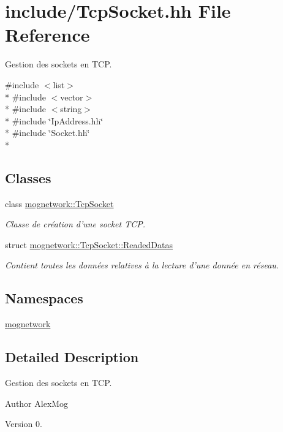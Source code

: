 \hypertarget{_tcp_socket_8hh}{\section{include/\-Tcp\-Socket.hh File Reference}
\label{_tcp_socket_8hh}
}


Gestion des sockets en T\-C\-P.  


{\ttfamily \#include $<$list$>$}\\*
{\ttfamily \#include $<$vector$>$}\\*
{\ttfamily \#include $<$string$>$}\\*
{\ttfamily \#include \char`\"{}Ip\-Address.\-hh\char`\"{}}\\*
{\ttfamily \#include \char`\"{}Socket.\-hh\char`\"{}}\\*
\subsection*{Classes}
\begin{DoxyCompactItemize}
\item 
class \hyperlink{classmognetwork_1_1_tcp_socket}{mognetwork\-::\-Tcp\-Socket}
\begin{DoxyCompactList}\small\item\em Classe de création d'une socket T\-C\-P. \end{DoxyCompactList}\item 
struct \hyperlink{structmognetwork_1_1_tcp_socket_1_1_readed_datas}{mognetwork\-::\-Tcp\-Socket\-::\-Readed\-Datas}
\begin{DoxyCompactList}\small\item\em Contient toutes les données relatives à la lecture d'une donnée en réseau. \end{DoxyCompactList}\end{DoxyCompactItemize}
\subsection*{Namespaces}
\begin{DoxyCompactItemize}
\item 
\hyperlink{namespacemognetwork}{mognetwork}
\end{DoxyCompactItemize}


\subsection{Detailed Description}
Gestion des sockets en T\-C\-P. \begin{DoxyAuthor}{Author}
Alex\-Mog 
\end{DoxyAuthor}
\begin{DoxyVersion}{Version}
0. 
\end{DoxyVersion}
